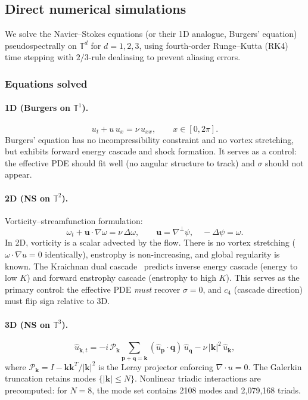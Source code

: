\documentclass[11pt,a4paper]{article}
\theoremstyle{remark}
\newcommand{\T}{\mathbb{T}}
\begin{document}
\subsection{Direct numerical simulations}

We solve the Navier--Stokes equations (or their 1D analogue, Burgers' equation) pseudospectrally on $\T^d$ for $d = 1, 2, 3$, using fourth-order Runge--Kutta (RK4) time stepping with $2/3$-rule dealiasing to prevent aliasing errors.

\subsubsection{Equations solved}

\paragraph{1D (Burgers on $\T^1$).}
\[
  u_t + u\,u_x = \nu\,u_{xx}, \qquad x \in [0, 2\pi].
\]
Burgers' equation has no incompressibility constraint and no vortex stretching, but exhibits forward energy cascade and shock formation.  It serves as a control: the effective PDE should fit well (no angular structure to track) and $\sigma$ should not appear.

\paragraph{2D (NS on $\T^2$).}
Vorticity--streamfunction formulation:
\[
  \omega_t + \mathbf{u} \cdot \nabla \omega = \nu\,\Delta \omega, \qquad \mathbf{u} = \nabla^\perp \psi, \quad -\Delta \psi = \omega.
\]
In 2D, vorticity is a scalar advected by the flow.  There is no vortex stretching ($\omega \cdot \nabla u = 0$ identically), enstrophy is non-increasing, and global regularity is known.  The Kraichnan dual cascade~\cite{kraichnan1967} predicts inverse energy cascade (energy to low $K$) and forward enstrophy cascade (enstrophy to high $K$).  This serves as the primary control: the effective PDE \emph{must} recover $\sigma = 0$, and $c_4$ (cascade direction) must flip sign relative to 3D.

\paragraph{3D (NS on $\T^3$).}
\[
  \hat{u}_{\mathbf{k},t} = -i\,\mathcal{P}_{\mathbf{k}} \sum_{\mathbf{p}+\mathbf{q}=\mathbf{k}} (\hat{u}_{\mathbf{p}} \cdot \mathbf{q})\, \hat{u}_{\mathbf{q}} - \nu\,|\mathbf{k}|^2\, \hat{u}_{\mathbf{k}},
\]
where $\mathcal{P}_{\mathbf{k}} = I - \mathbf{k}\mathbf{k}^T/|\mathbf{k}|^2$ is the Leray projector enforcing $\nabla \cdot u = 0$.  The Galerkin truncation retains modes $\{|\mathbf{k}| \leq N\}$.  Nonlinear triadic interactions are precomputed: for $N = 8$, the mode set contains 2108 modes and 2,079,168 triads.
\end{document}
